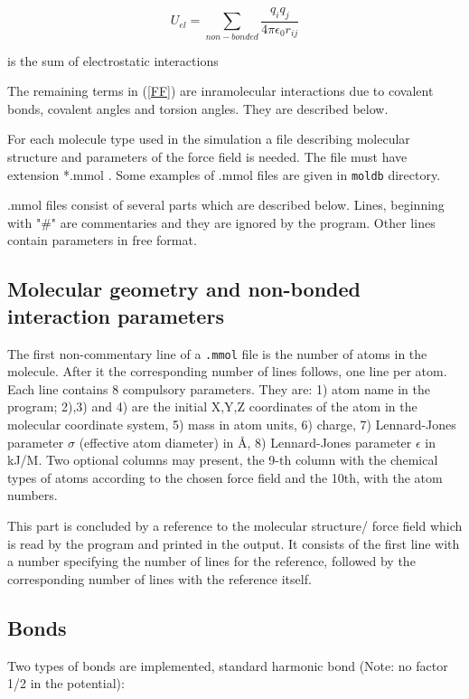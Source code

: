 \documentclass{article}
\begin{document}
\begin{equation}
U_{el} = \sum_{non-bonded}\frac{q_iq_j}{4\pi\epsilon_0r_{ij}}
\end{equation}

is the sum of electrostatic interactions

The remaining terms in (\ref{FF}) are inramolecular interactions
due to covalent bonds, covalent angles and torsion angles. They are 
described below.

For each molecule type used in the simulation a file describing molecular 
structure and parameters of the force field is needed. The 
file must have extension *.mmol . Some examples of .mmol files are given 
in \verb|moldb| directory.
 
.mmol files consist of several parts which are described below.
Lines, beginning with "\#" are commentaries and they are ignored by the 
program. Other lines contain parameters in free format. 

\subsection{Molecular geometry and non-bonded interaction parameters}

The first non-commentary line of a \verb|.mmol| file is the number of atoms 
in the molecule. After it the corresponding number of lines follows, one 
line per atom. Each line contains 8 compulsory
parameters. They are: 1) atom name in the program; 2),3) and 4) are the
initial X,Y,Z coordinates of the atom in the molecular coordinate system,
5) mass in atom units, 6) charge, 7) Lennard-Jones parameter $\sigma$
(effective atom diameter) in \AA, 8) Lennard-Jones parameter $\epsilon$
in kJ/M. Two optional columns may present, the 9-th column with the
chemical types of atoms according to the chosen force field and the 10th,
with the atom numbers.

This part is concluded by a reference to the molecular structure/
force field which is read by the program and printed in the output. It
consists of the first line with a number specifying the number of lines 
for the reference, followed by the corresponding number of lines with the 
reference itself.

\subsection{Bonds}

Two types of bonds are implemented, standard harmonic bond 
(Note: no factor 1/2 in the potential):
\end{document}
